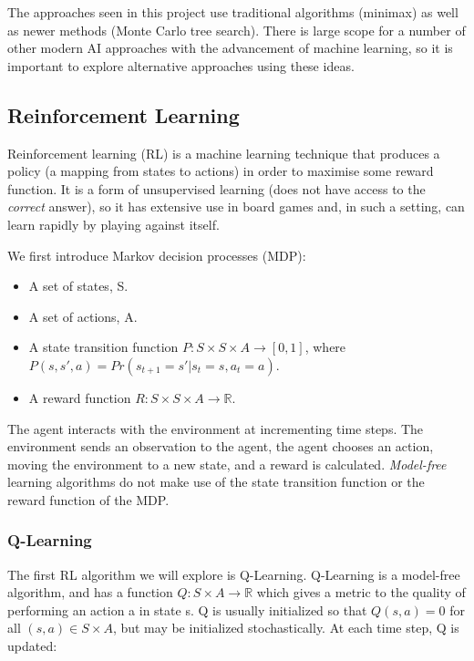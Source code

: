 The approaches seen in this project use traditional algorithms (minimax) as well as newer methods (Monte Carlo tree search). There is large scope for a number of other modern AI approaches with the advancement of machine learning, so it is important to explore alternative approaches using these ideas.


\subsection{Reinforcement Learning}

Reinforcement learning (RL) is a machine learning technique that produces a policy (a mapping from states to actions) in order to maximise some reward function. It is a form of unsupervised learning (does not have access to the \textit{correct} answer), so it has extensive use in board games and, in such a setting, can learn rapidly by playing against itself.

We first introduce Markov decision processes (MDP):

\begin{itemize}
    \item A set of states, S.
    \item A set of actions, A.
    \item A state transition function $P : S \times S \times A \to [0,1]$, where \newline $P(s,s',a) = Pr(s_{t+1} = s' | s_t = s, a_t = a)$.
    \item A reward function $R : S \times S \times A \to \mathbb{R}$.
\end{itemize}


The agent interacts with the environment at incrementing time steps. The environment sends an observation to the agent, the agent chooses an action, moving the environment to a new state, and a reward is calculated. \textit{Model-free} learning algorithms do not make use of the state transition function or the reward function of the MDP.


\subsubsection{Q-Learning}

The first RL algorithm we will explore is Q-Learning. Q-Learning is a model-free algorithm, and has a function $Q : S \times A \to \mathbb{R}$ which gives a metric to the quality of performing an action a in state s. Q is usually initialized so that $Q(s,a) = 0$ for all $(s, a) \in S\times A$, but may be initialized stochastically. At each time step, Q is updated:

